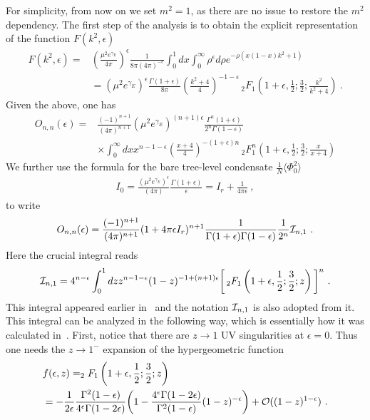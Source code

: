 \documentclass[a4paper,11pt]{article}
\begin{document}
For simplicity, from now on we set $m^2=1$, as there are no issue to restore the $m^2$ dependency. The first step of the analysis is to obtain the explicit representation of the function $F(k^2,\epsilon)$~\cite{Marino:2021six}
\begin{align}
F(k^2,\epsilon)=&\left(\frac{\mu^2e^{\gamma_E}}{4\pi}\right)^{\epsilon} \frac{1}{8\pi (4\pi)^{-\epsilon}}\int_0^1 dx\int_0^{\infty}\rho^{\epsilon}d\rho e^{-\rho(x(1-x)k^2+1)} \nonumber \\ 
&=(\mu^2e^{\gamma_E})^{\epsilon}\frac{\Gamma(1+\epsilon)}{8\pi}\left(\frac{k^2+4}{4}\right)^{-1-\epsilon}\, _2F_1\left(1+\epsilon,\frac{1}{2};\frac{3}{2};\frac{k^2}{k^2+4}\right) \ .
\end{align}
Given the above, one has
\begin{align}
O_{n,n}(\epsilon)=&\frac{(-1)^{n+1}}{(4\pi)^{n+1}}(\mu^2e^{\gamma_E})^{(n+1)\epsilon}\frac{\Gamma^n(1+\epsilon)}{2^n\Gamma(1-\epsilon)}\nonumber \\ 
&\times\int_0^{\infty} dx x^{n-1-\epsilon}\left(\frac{x+4}{4}\right)^{-(1+\epsilon)n}\, _2F_1^n\left(1+\epsilon,\frac{1}{2};\frac{3}{2};\frac{x}{x+4}\right) 
\end{align}
We further use the formula for the bare tree-level condensate $\frac{1}{N}\langle \Phi^2_0\rangle$
\begin{align}
I_0=\frac{(\mu^2e^{\gamma_E})^{\epsilon}}{(4\pi)}\frac{\Gamma(1+\epsilon)}{\epsilon}=I_r+\frac{1}{4\pi \epsilon} \ ,
\end{align}
to write
\begin{align}
O_{n,n}(\epsilon)=\frac{(-1)^{n+1}}{(4\pi)^{n+1}}(1+4\pi \epsilon I_r)^{n+1}\frac{1}{\Gamma(1+\epsilon)\Gamma(1-\epsilon)}\frac{1}{2^n}{\cal I}_{n,1} \ .
\end{align}
Here the crucial integral reads
\begin{align}
{\cal I}_{n,1}=4^{n-\epsilon}\int_0^1 dz z^{n-1-\epsilon}(1-z)^{-1+(n+1)\epsilon}\bigg[\, _2F_1\left(1+\epsilon,\frac{1}{2};\frac{3}{2};z\right)\bigg]^n \ .
\end{align}
This integral appeared earlier  in~\cite{Marino:2021six} and the notation ${\cal I}_{n,1}$ is also adopted from it. This integral can be analyzed in the following way, which is essentially how it was calculated in~\cite{Marino:2021six}. First, notice that there are $z\rightarrow 1$ UV singularities at $\epsilon=0$. Thus one needs the $z\rightarrow 1^-$ expansion of the hypergeometric function~\cite{Marino:2021six} 
\begin{align}
&f(\epsilon,z)=_2F_1\left(1+\epsilon,\frac{1}{2};\frac{3}{2};z\right) \nonumber \\ 
&=-\frac{1}{2\epsilon}\frac{\Gamma^2(1-\epsilon)}{4^{\epsilon}\Gamma(1-2\epsilon)} \bigg(1-\frac{4^{\epsilon}\Gamma(1-2\epsilon)}{\Gamma^2(1-\epsilon)}(1-z)^{-\epsilon}\bigg)+{\cal O}((1-z)^{1-\epsilon}) \ .
\end{align}
\end{document}
